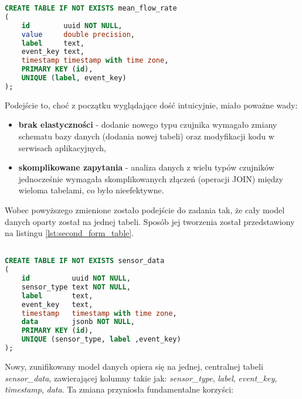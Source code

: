 {\begin{lstlisting}[caption=Pierwsza forma tabeli w relacyjnej bazie danych, label={lst:first_form_table},language=SQL]
CREATE TABLE IF NOT EXISTS mean_flow_rate
(
    id        uuid NOT NULL,
    value     double precision,
    label     text,
    event_key text,
    timestamp timestamp with time zone,
    PRIMARY KEY (id),
    UNIQUE (label, event_key)
);

\end{lstlisting}

\vspace{0.3em}

Podejście to, choć z początku wyglądające dość intuicyjnie, miało poważne wady:

\vspace{0.3em}

\begin{itemize}
    \item \textbf{brak elastyczności} - dodanie nowego typu czujnika wymagało zmiany schematu bazy danych (dodania nowej tabeli) oraz modyfikacji kodu w serwisach aplikacyjnych,
    \item \textbf{skomplikowane zapytania} - analiza danych z wielu typów czujników jednocześnie wymagała skomplikowanych złączeń (operacji JOIN) \cite{kleppmann2017designing} między wieloma tabelami, co było nieefektywne.
\end{itemize}

\vspace{0.3em}

Wobec powyższego zmienione zostało podejście do zadania tak, że cały model danych oparty został na jednej tabeli. Sposób jej tworzenia został przedstawiony na listingu \ref{lst:second_form_table}.

\vspace{0.3em}


\begin{lstlisting}[caption=Druga forma tabeli w relacyjnej bazie danych, label={lst:second_form_table},language=SQL]

CREATE TABLE IF NOT EXISTS sensor_data
(
    id          uuid NOT NULL,
    sensor_type text NOT NULL,
    label       text,
    event_key   text,
    timestamp   timestamp with time zone,
    data        jsonb NOT NULL,
    PRIMARY KEY (id),
    UNIQUE (sensor_type, label ,event_key)
);
\end{lstlisting}


Nowy, zunifikowany model danych opiera się na jednej, centralnej tabeli \textit{sensor\_data}, zawierającej kolumny takie jak: \textit{sensor\_type}, \textit{label}, \textit{event\_key}, \textit{timestamp}, \textit{data}. Ta zmiana przyniosła fundamentalne korzyści:

}
